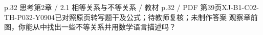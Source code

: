 \par\noindent\begin{minipage}{\linewidth}
\begin{bankitem}{p.32 思考}{第2章 / 2.1 相等关系与不等关系 / 教材 p.32 / PDF 第39页}{XJ-B1-C02-TH-P032-Y0904}{已对照原页转写题干及公式；待教师复核；未制作答案}
观察章前图，你能从中找出一些不等关系并用数学语言描述吗？
\end{bankitem}
\end{minipage}\par\medskip
